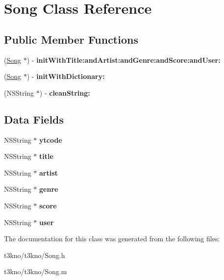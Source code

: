 \hypertarget{interface_song}{\section{Song Class Reference}
\label{interface_song}
}
\subsection*{Public Member Functions}
\begin{DoxyCompactItemize}
\item 
\hypertarget{interface_song_a98add8780c79764b02261ce2ed6ae133}{(\hyperlink{interface_song}{Song} $\ast$) -\/ {\bfseries init\-With\-Title\-:and\-Artist\-:and\-Genre\-:and\-Score\-:and\-User\-:}}\label{interface_song_a98add8780c79764b02261ce2ed6ae133}

\item 
\hypertarget{interface_song_a2189d269474a6d6e0c50402d4956b776}{(\hyperlink{interface_song}{Song} $\ast$) -\/ {\bfseries init\-With\-Dictionary\-:}}\label{interface_song_a2189d269474a6d6e0c50402d4956b776}

\item 
\hypertarget{interface_song_ad0fff5566893db83037ec2c93987c198}{(N\-S\-String $\ast$) -\/ {\bfseries clean\-String\-:}}\label{interface_song_ad0fff5566893db83037ec2c93987c198}

\end{DoxyCompactItemize}
\subsection*{Data Fields}
\begin{DoxyCompactItemize}
\item 
\hypertarget{interface_song_a637f23ec316ab21f34752347e0b9b2b3}{N\-S\-String $\ast$ {\bfseries ytcode}}\label{interface_song_a637f23ec316ab21f34752347e0b9b2b3}

\item 
\hypertarget{interface_song_ad39b2fbc36bb32f1287f61db3d3477a1}{N\-S\-String $\ast$ {\bfseries title}}\label{interface_song_ad39b2fbc36bb32f1287f61db3d3477a1}

\item 
\hypertarget{interface_song_a5216e2b124d6c4f7212c6453c5d4275c}{N\-S\-String $\ast$ {\bfseries artist}}\label{interface_song_a5216e2b124d6c4f7212c6453c5d4275c}

\item 
\hypertarget{interface_song_a7c1b0908f1c1baf659631685277af454}{N\-S\-String $\ast$ {\bfseries genre}}\label{interface_song_a7c1b0908f1c1baf659631685277af454}

\item 
\hypertarget{interface_song_a5f98c15a134637438ef145ef3a6e8a62}{N\-S\-String $\ast$ {\bfseries score}}\label{interface_song_a5f98c15a134637438ef145ef3a6e8a62}

\item 
\hypertarget{interface_song_a7976ff65e4b8771bfb5f1b8b3a4b791e}{N\-S\-String $\ast$ {\bfseries user}}\label{interface_song_a7976ff65e4b8771bfb5f1b8b3a4b791e}

\end{DoxyCompactItemize}


The documentation for this class was generated from the following files\-:\begin{DoxyCompactItemize}
\item 
t3kno/t3kno/Song.\-h\item 
t3kno/t3kno/Song.\-m\end{DoxyCompactItemize}
